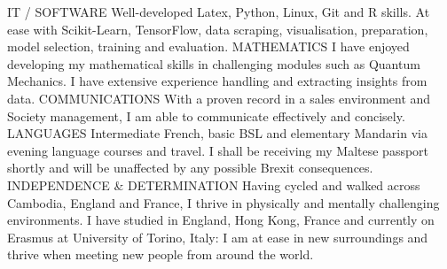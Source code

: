 \begin{cvhonors}
  \cvhonor
    {IT / SOFTWARE}
    {Well-developed Latex, Python, Linux, Git and R skills. At ease with Scikit-Learn, TensorFlow, data scraping, visualisation, preparation, model selection, training and evaluation.}
    {}
    {}
  \cvhonor
    {MATHEMATICS}
    {I have enjoyed developing my mathematical skills in challenging modules such as Quantum Mechanics. I have extensive experience handling and extracting insights from data.}
    {}
    {}
    \cvhonor
    {COMMUNICATIONS}
    {With a proven record in a sales environment and Society management, I am able to communicate effectively and concisely.}
    {}
    {}
    \cvhonor
    {LANGUAGES}
    {Intermediate French, basic BSL and elementary Mandarin via evening language courses and travel. I shall be receiving my Maltese passport shortly and will be unaffected by any possible Brexit consequences.}
    {}
    {}
    \cvhonor
    {INDEPENDENCE \& DETERMINATION}
    {Having cycled and walked across Cambodia, England and France, I thrive in physically and mentally challenging environments. I have studied in England, Hong Kong, France  and currently on Erasmus at University of Torino, Italy: I am at ease in new surroundings and thrive when meeting new people from around the world.}
    {}
    {}
\end{cvhonors}
